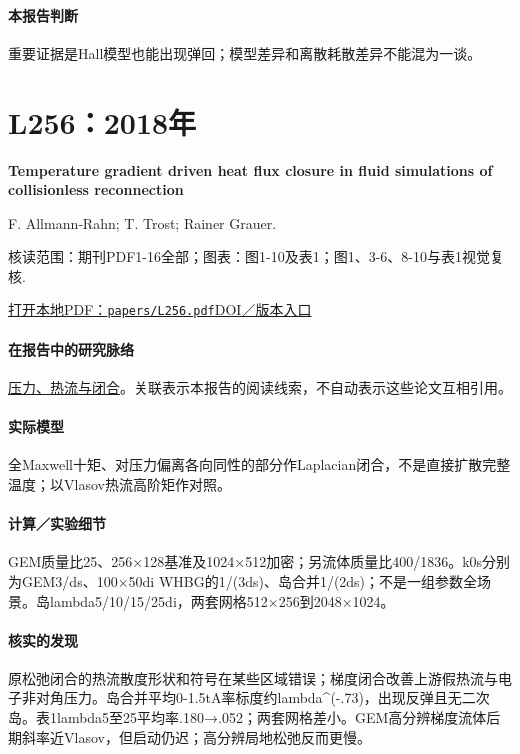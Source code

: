 \paragraph{本报告判断}重要证据是Hall模型也能出现弹回；模型差异和离散耗散差异不能混为一谈。

\section{L256：2018年}\label{paper:L256}

\textbf{Temperature gradient driven heat flux closure in fluid simulations of collisionless reconnection}\citep{L256}\

F. Allmann‐Rahn;  T. Trost;  Rainer Grauer.

\textsf{核读范围：}期刊PDF1-16全部；\textsf{图表：}图1-10及表1；图1、3-6、8-10与表1视觉复核.

\href{run:papers/L256.pdf}{打开本地PDF：\texttt{papers/L256.pdf}}\quad\href{https://doi.org/10.1017/s002237781800048x}{DOI／版本入口}

\paragraph{在报告中的研究脉络}\hyperref[story:closure]{压力、热流与闭合}。关联表示本报告的阅读线索，不自动表示这些论文互相引用。

\paragraph{实际模型}全Maxwell十矩、对压力偏离各向同性的部分作Laplacian闭合，不是直接扩散完整温度；以Vlasov热流高阶矩作对照。

\paragraph{计算／实验细节}GEM质量比25、256×128基准及1024×512加密；另流体质量比400/1836。k0s分别为GEM3/ds、100×50di WHBG的1/(3ds)、岛合并1/(2ds)；不是一组参数全场景。岛lambda5/10/15/25di，两套网格512×256到2048×1024。

\paragraph{核实的发现}原松弛闭合的热流散度形状和符号在某些区域错误；梯度闭合改善上游假热流与电子非对角压力。岛合并平均0-1.5tA率标度约lambda\textasciicircum{}(-.73)，出现反弹且无二次岛。表1lambda5至25平均率.180→.052；两套网格差小。GEM高分辨梯度流体后期斜率近Vlasov，但启动仍迟；高分辨局地松弛反而更慢。


